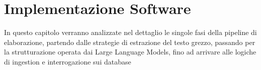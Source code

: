 \chapter{Implementazione Software}\label{chap:fourth}

\inlineminitoc

In questo capitolo verranno analizzate nel dettaglio le singole fasi della pipeline di elaborazione, partendo dalle strategie di estrazione del testo grezzo, passando per la strutturazione operata dai Large Language Models, fino ad arrivare alle logiche di ingestion e interrogazione sui database










